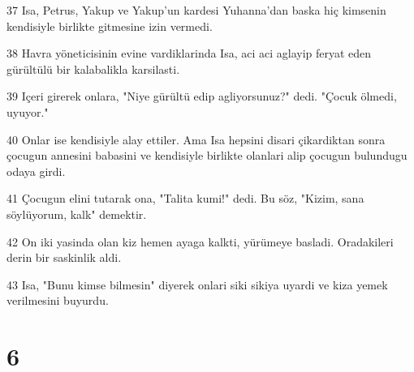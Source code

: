 \par 37 Isa, Petrus, Yakup ve Yakup'un kardesi Yuhanna'dan baska hiç kimsenin kendisiyle birlikte gitmesine izin vermedi.
\par 38 Havra yöneticisinin evine vardiklarinda Isa, aci aci aglayip feryat eden gürültülü bir kalabalikla karsilasti.
\par 39 Içeri girerek onlara, "Niye gürültü edip agliyorsunuz?" dedi. "Çocuk ölmedi, uyuyor."
\par 40 Onlar ise kendisiyle alay ettiler. Ama Isa hepsini disari çikardiktan sonra çocugun annesini babasini ve kendisiyle birlikte olanlari alip çocugun bulundugu odaya girdi.
\par 41 Çocugun elini tutarak ona, "Talita kumi!" dedi. Bu söz, "Kizim, sana söylüyorum, kalk" demektir.
\par 42 On iki yasinda olan kiz hemen ayaga kalkti, yürümeye basladi. Oradakileri derin bir saskinlik aldi.
\par 43 Isa, "Bunu kimse bilmesin" diyerek onlari siki sikiya uyardi ve kiza yemek verilmesini buyurdu.

\chapter{6}

